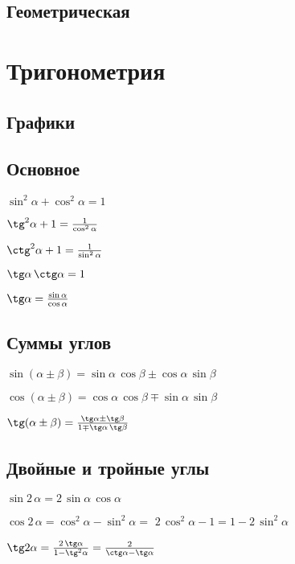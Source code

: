 \subsection{Геометрическая}


\section{Тригонометрия}

\subsection{Графики}

\subsection{Основное}

$ \sin^2 \alpha + \cos^2 \alpha = 1 $

$ \tg^2 \alpha + 1 = \frac{1}{\cos^2 \alpha} $

$ \ctg^2 \alpha + 1 = \frac{1}{\sin^2 \alpha} $

$ \tg \alpha\, \ctg \alpha = 1 $

$ \tg \alpha = \frac{\sin \alpha}{\cos \alpha} $

\subsection{Суммы углов}

$ \sin(\alpha\pm \beta) = \sin \alpha\, \cos \beta \pm \cos \alpha\, \sin \beta $

$ \cos(\alpha\pm \beta) = \cos \alpha\, \cos \beta \mp \sin \alpha\, \sin \beta $

$ \tg (\alpha \pm \beta) = \frac{\tg \alpha \pm \tg \beta}{1 \mp \tg \alpha \, \tg \beta} $

\subsection{Двойные и тройные углы}

$ \sin 2\, \alpha = 2\, \sin \alpha\, \cos \alpha $

$ \cos 2\, \alpha = \cos^2 \alpha - \sin^2 \alpha = $ $ 2\, \cos^2 \alpha - 1 = 1 - 2\, \sin^2 \alpha $

$ \tg 2\alpha = \frac{2\, \tg \alpha}{1 - \tg^2 \alpha} = \frac{2}{\ctg \alpha - \tg \alpha} $

